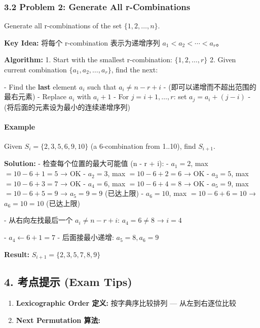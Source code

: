 \documentclass[10pt,a4paper,openany]{ctexbook}
\theoremstyle{definition}
\theoremstyle{remark}
\renewenvironment{quote}
  {\list{}{\leftmargin=1em\rightmargin=0pt\topsep=0.5pt\partopsep=0pt}\item[]}
  {\endlist}
\begin{document}
\subsubsection{3.2 Problem 2: Generate All r-Combinations}

\begin{quote}
Generate all r-combinations of the set $\{1, 2, \ldots, n\}$.

\textbf{Key Idea:} 将每个 r-combination 表示为递增序列 $a_1 < a_2 < \cdots < a_r$。

\textbf{Algorithm:}
1. Start with the smallest r-combination: $\{1, 2, \ldots, r\}$
2. Given current combination $\{a_1, a_2, \ldots, a_r\}$, find the next:

- Find the \textbf{last} element $a_i$ such that $a_i \neq n - r + i$
- (即可以递增而不超出范围的最右元素)
- Replace $a_i$ with $a_i + 1$
- For $j = i+1, \ldots, r$: set $a_j = a_{i} + (j - i)$
- (将后面的元素设为最小的连续递增序列)

\end{quote}

\paragraph{Example}

\begin{quote}
Given $S_i = \{2, 3, 5, 6, 9, 10\}$ (a 6-combination from {1..10}), find $S_{i+1}$.

\textbf{Solution:}
- 检查每个位置的最大可能值 (n - r + i):
- $a_1=2$, max $=10-6+1=5$ → OK
- $a_2=3$, max $=10-6+2=6$ → OK
- $a_3=5$, max $=10-6+3=7$ → OK
- $a_4=6$, max $=10-6+4=8$ → OK
- $a_5=9$, max $=10-6+5=9$ → $a_5 = 9 = 9$ (已达上限)
- $a_6=10$, max $=10-6+6=10$ → $a_6 = 10 = 10$ (已达上限)

- 从右向左找最后一个 $a_i \neq n-r+i$: $a_4 = 6 \neq 8$ → $i=4$

- $a_4 \leftarrow 6+1 = 7$
- 后面接最小递增: $a_5 = 8, a_6 = 9$

\textbf{Result:} $S_{i+1} = \{2, 3, 5, 7, 8, 9\}$

\end{quote}
\vspace{-2pt}

\subsection{4. 考点提示 (Exam Tips)}

\begin{enumerate}
\item \textbf{Lexicographic Order 定义:} 按字典序比较排列 — 从左到右逐位比较
\item \textbf{Next Permutation 算法:}
\end{enumerate}
\end{document}
